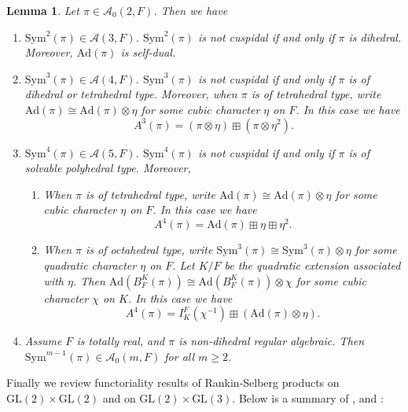 \documentclass[12pt]{amsart}
\newcommand{\Ad}{\text{Ad}}
\newcommand{\Sym}{\text{Sym}}
\newcommand{\GL}{\text{GL}}
\newcommand{\cA}{\mathcal{A}}
\newtheorem{lemma}{Lemma}[section]
\begin{document}
\begin{lemma}\label{symmetric power functorality}
    Let $\pi \in \cA_0(2,F)$. Then we have 
    \begin{enumerate}
        \item $\Sym^2(\pi) \in \cA(3,F)$. $\Sym^2(\pi)$ is not cuspidal if and only if $\pi$ is dihedral. Moreover, $\Ad(\pi)$ is self-dual.
        \item $\Sym^3(\pi) \in \cA(4,F)$. $\Sym^3(\pi)$ is not cuspidal if and only if $\pi$ is of dihedral or tetrahedral type. Moreover, when $\pi$ is of tetrahedral type, write $\Ad(\pi) \cong \Ad(\pi) \otimes \eta$ for some cubic character $\eta$ on $F$. In this case we have
        $$A^3(\pi) = (\pi \otimes \eta) \boxplus (\pi \otimes \eta^2).$$
        \item $\Sym^4(\pi) \in \cA(5,F)$. $\Sym^4(\pi)$ is not cuspidal if and only if $\pi$ is of solvable polyhedral type. Moreover,
        \begin{enumerate}
            \item When $\pi$ is of tetrahedral type, write $\Ad(\pi) \cong \Ad(\pi) \otimes \eta$ for some cubic character $\eta$ on $F$. In this case we have 
            $$A^4(\pi) = \Ad(\pi) \boxplus\eta \boxplus \eta^2.$$
            \item When $\pi$ is of octahedral type, write $\Sym^3(\pi) \cong \Sym^3(\pi) \otimes \eta$ for some quadratic character $\eta$ on $F$. Let $K/F$ be the quadratic extension associated with $\eta$. Then $\Ad(B_F^K(\pi)) \cong \Ad(B_F^K(\pi)) \otimes \chi$ for some cubic character $\chi$ on $K$. In this case we have 
            $$A^4(\pi) = I_K^F(\chi^{-1}) \boxplus (\Ad(\pi) \otimes \eta).$$
        \end{enumerate}
        \item Assume $F$ is totally real, and $\pi$ is non-dihedral regular algebraic. Then $\Sym^{m-1}(\pi) \in \cA_0(m,F)$ for all $m \geq 2$.
    \end{enumerate}
\end{lemma}

Finally we review functoriality results of Rankin-Selberg products on $\GL(2) \times \GL(2)$ and on $\GL(2) \times \GL(3)$. Below is a summary of \cite[Theorem M]{Ramakrishnan2000}, \cite[Theorem A]{KimShahidi2002Cube} and \cite[Theorem 3.1]{RamakrishnanWang2004}:
\end{document}
